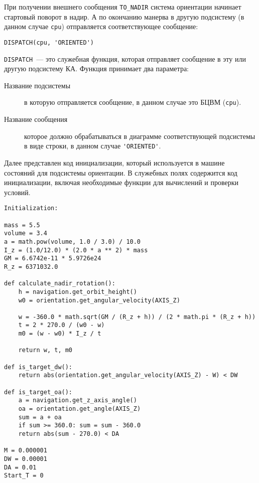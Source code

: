 \documentclass[12pt,a4paper]{article}
\begin{document}
При получении внешнего сообщения \verb'TO_NADIR' система ориентации начинает стартовый
поворот в надир. А по окончанию манерва в другую подсистему (в данном случае \verb'cpu')
отправляется соответствующее сообщение:

\begin{center}
\begin{verbatim}
DISPATCH(cpu, 'ORIENTED')
\end{verbatim}
\end{center}

\verb'DISPATCH'~--- это служебная функция, которая отправляет сообщение в эту или другую
подсистему КА. Функция принимает два параметра:

\begin{description}
\item[Название подсистемы] в которую отправляется сообщение, в данном случае это БЦВМ
  (\verb'cpu').
\item[Название сообщения] которое должно обрабатываться в диаграмме соответствующей
  подсистемы в виде строки, в данном случае \verb"'ORIENTED'".
\end{description}

Далее представлен код инициализации, который используется в машине состояний для
подсистемы ориентации. В служебных полях содержится код инициализации, включая необходимые
функции для вычислений и проверки условий.

\begin{verbatim}
Initialization:

mass = 5.5
volume = 3.4
a = math.pow(volume, 1.0 / 3.0) / 10.0
I_z = (1.0/12.0) * (2.0 * a ** 2) * mass
GM = 6.6742e-11 * 5.9726e24 
R_z = 6371032.0

def calculate_nadir_rotation():
    h = navigation.get_orbit_height()
    w0 = orientation.get_angular_velocity(AXIS_Z)

    w = -360.0 * math.sqrt(GM / (R_z + h)) / (2 * math.pi * (R_z + h))
    t = 2 * 270.0 / (w0 - w)
    m0 = (w - w0) * I_z / t

    return w, t, m0

def is_target_dw():
    return abs(orientation.get_angular_velocity(AXIS_Z) - W) < DW

def is_target_oa():
    a = navigation.get_z_axis_angle()
    oa = orientation.get_angle(AXIS_Z)
    sum = a + oa
    if sum >= 360.0: sum = sum - 360.0
    return abs(sum - 270.0) < DA

M = 0.000001
DW = 0.00001
DA = 0.01
Start_T = 0
\end{verbatim}
\end{document}
